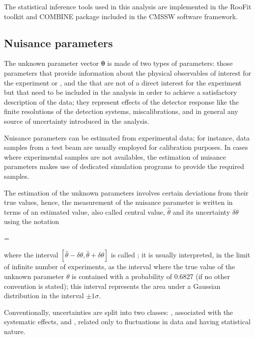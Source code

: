 The statistical inference tools used in this analysis are implemented in the RooFit toolkit \cite {roofit} and COMBINE package \cite{combine} included in the CMSSW software framework. 

\subsection{Nuisance parameters}

The unknown parameter vector $\bm{\theta}$ is made of two types of parameters: those parameters that provide information about the physical observables of interest for the experiment or , and the  that are not of a direct interest for the experiment but that need to be included in the analysis in order to achieve a satisfactory description of the data; they represent effects of the detector response like the finite resolutions of the detection systems, miscalibrations, and in general any source of uncertainty introduced in the analysis.

Nuisance parameters can be estimated from experimental data; for instance, data samples from a test beam are usually employed for calibration purposes. In cases where experimental samples are not availables, the estimation of nuisance parameters makes use of dedicated simulation programs to provide the required samples.

The estimation of the unknown parameters involves certain deviations from their true values, hence, the measurement of the nuisance parameter is written in terms of an estimated value, also called central value,  $\hat{\theta}$ and its uncertainty $\delta \theta$ using the notation

\beqn
\theta=\hat{\theta}\pm\delta \theta  
\eeqn

\noindent where the interval $[\hat{\theta}-\delta \theta, \hat{\theta}+\delta \theta]$ is called ; it is usually interpreted, in the limit of infinite number of experiments, as the interval where the true value of the unknown parameter $\theta$ is contained with a probability of 0.6827 (if no other convention is stated); this interval represents the area under a Gaussian distribution in the interval $\pm 1\sigma$.    

Conventionally, uncertainties are split into two classes: , associated with the systematic effects, and , related only to fluctuations in data and having statistical nature. 

